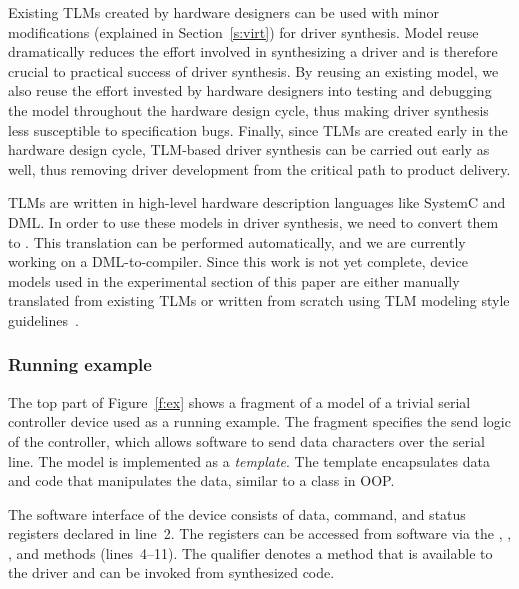 Existing TLMs created by hardware designers can be used with minor modifications (explained in Section~\ref{s:virt}) for driver synthesis.  Model reuse dramatically reduces the effort involved in synthesizing a driver and is therefore crucial to practical success of driver synthesis.  By reusing an existing model, we also reuse the effort invested by hardware designers into testing and debugging the model throughout the hardware design cycle, thus making driver synthesis less susceptible to specification bugs.  Finally, since TLMs are created early in the hardware design cycle, TLM-based driver synthesis can be carried out early as well, thus removing driver development from the critical path to product delivery.

TLMs are written in high-level hardware description languages like SystemC and DML.  In order to use these models in driver synthesis, we need to convert them to \tsl.  This translation can be performed automatically, and we are currently working on a DML-to-\tsl compiler.  Since this work is not yet complete, device models used in the experimental section of this paper are either manually translated from existing TLMs or written from scratch using TLM modeling style guidelines~\cite{dml_ug}.


\subsubsection{Running example}

The top part of Figure~\ref{f:ex} shows a fragment of a model of a trivial serial controller device used as a running example.  The fragment specifies the send logic of the controller, which allows software to send data characters over the serial line.  The model is implemented as a \tsl \emph{template}.  The template encapsulates data and code that manipulates the data, similar to a class in OOP.

The software interface of the device consists of data, command, and status registers declared in line~2.  The registers can be accessed from software via the , , , and  methods (lines~4--11).  The  qualifier denotes a method that is available to the driver and can be invoked from synthesized code.

